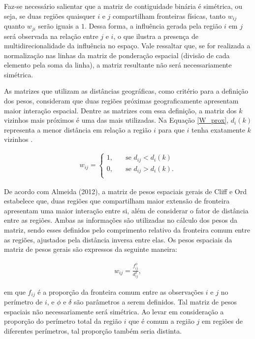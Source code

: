 \documentclass[12pt,a4paper]{article}
\begin{document}
Faz-se necessário salientar que a matriz de contiguidade binária é simétrica, ou seja, se duas regiões quaisquer $i$ e $j$ compartilham fronteiras físicas, tanto $w_{ij}$ quanto $w_{ji}$ serão iguais a $1$. Dessa forma, a influência gerada pela região $i$ em $j$ será observada na relação entre $j$ e $i$, o que ilustra a presença de multidirecionalidade da influência no espaço. Vale ressaltar que, se for realizada a normalização nas linhas da matriz de ponderação espacial (divisão de cada elemento pela soma da linha), a matriz resultante não será necessariamente simétrica.
	
As matrizes que utilizam as distâncias geográficas, como critério para a definição dos pesos, consideram que duas regiões próximas geograficamente apresentam maior interação espacial. Dentre as matrizes com essa definição, a matriz dos $k$ vizinhos mais próximos é uma das mais utilizadas. Na Equação \ref{W_prox}, $d_i(k)$ representa a menor distância em relação a região $i$ para que $i$ tenha exatamente $k$ vizinhos \cite{almeida12_g}.
	
\begin{align}
	w_{ij} = 
	\begin{cases}
    	\text{$1,$} & \quad\text{se $d_{ij} < d_i(k)$} \\
	    \text{$0,$} & \quad\text{se $d_{ij} > d_i(k)$}.\\
	\end{cases}
	\label{W_prox}
\end{align}
	
De acordo com Almeida (2012), a matriz de pesos espaciais gerais de Cliff e Ord  estabelece que, duas regiões que compartilham maior extensão de fronteira apresentam uma maior interação entre si, além de considerar o fator de distância entre as regiões. Ambas as informações são utilizadas no cálculo dos pesos da matriz, sendo esses definidos pelo comprimento relativo da fronteira comum entre as regiões, ajustados pela distância inversa entre elas. Os pesos espaciais da matriz de pesos gerais são expressos da seguinte maneira:
	
\begin{align*}
	w_{ij} = \frac{f_{ij}^\phi}{d_{ij}^\delta},
\end{align*}
	
\noindent em que $f_{ij}$ é a proporção da fronteira comum entre as observações $i$ e $j$ no perímetro de $i$, e $\phi$ e $\delta$ são parâmetros a serem definidos. Tal matriz de pesos espaciais não necessariamente será simétrica. Ao levar em consideração a proporção do perímetro total da região $i$ que é comum a região $j$ em regiões de diferentes perímetros, tal proporção também seria distinta.
	
\end{document}
